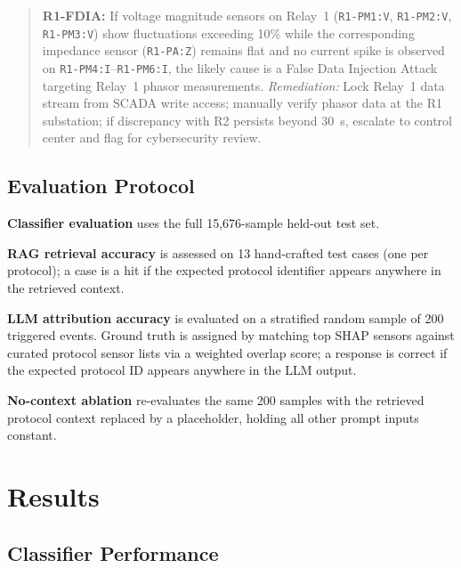 \documentclass[twocolumn, 10pt, letterpaper]{article}
\begin{document}
\begin{quote}\small
\textbf{R1-FDIA:} If voltage magnitude sensors on Relay~1 (\texttt{R1-PM1:V},
\texttt{R1-PM2:V}, \texttt{R1-PM3:V}) show fluctuations exceeding 10\% while the
corresponding impedance sensor (\texttt{R1-PA:Z}) remains flat and no current spike
is observed on \texttt{R1-PM4:I}--\texttt{R1-PM6:I}, the likely cause is a False
Data Injection Attack targeting Relay~1 phasor measurements.
\textit{Remediation:} Lock Relay~1 data stream from SCADA write access; manually
verify phasor data at the R1 substation; if discrepancy with R2 persists beyond
30~s, escalate to control center and flag for cybersecurity review.
\end{quote}

\subsection{Evaluation Protocol}

\textbf{Classifier evaluation} uses the full 15,676-sample held-out test set.

\textbf{RAG retrieval accuracy} is assessed on 13 hand-crafted test cases
(one per protocol); a case is a hit if the expected protocol identifier appears
anywhere in the retrieved context.

\textbf{LLM attribution accuracy} is evaluated on a stratified random sample of
200 triggered events.
Ground truth is assigned by matching top SHAP sensors against curated protocol
sensor lists via a weighted overlap score; a response is correct if the expected
protocol ID appears anywhere in the LLM output.

\textbf{No-context ablation} re-evaluates the same 200 samples with the retrieved
protocol context replaced by a placeholder, holding all other prompt inputs
constant.

\section{Results}
\label{sec:results}

\subsection{Classifier Performance}
\end{document}
